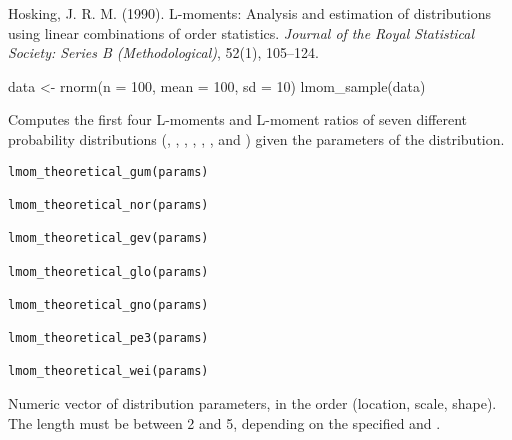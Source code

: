 \documentclass[a4paper]{book}
\begin{document}
%
\begin{References}
Hosking, J. R. M. (1990). L-moments: Analysis and estimation of distributions
using linear combinations of order statistics. \emph{Journal of the Royal Statistical
Society: Series B (Methodological)}, 52(1), 105–124.
\end{References}
%
\begin{Examples}
\begin{ExampleCode}
data <- rnorm(n = 100, mean = 100, sd = 10)
lmom_sample(data)

\end{ExampleCode}
\end{Examples}
%
\begin{Description}
Computes the first four L-moments and L-moment ratios of seven different probability
distributions (, , , , , , and )
given the parameters of the distribution.
\end{Description}
%
\begin{Usage}
\begin{verbatim}
lmom_theoretical_gum(params)

lmom_theoretical_nor(params)

lmom_theoretical_gev(params)

lmom_theoretical_glo(params)

lmom_theoretical_gno(params)

lmom_theoretical_pe3(params)

lmom_theoretical_wei(params)
\end{verbatim}
\end{Usage}
%
\begin{Arguments}
\begin{ldescription}
\item[\code{params}] Numeric vector of distribution parameters, in the order (location,
scale, shape). The length must be between 2 and 5, depending on the specified
 and .
\end{ldescription}
\end{Arguments}
\end{document}
